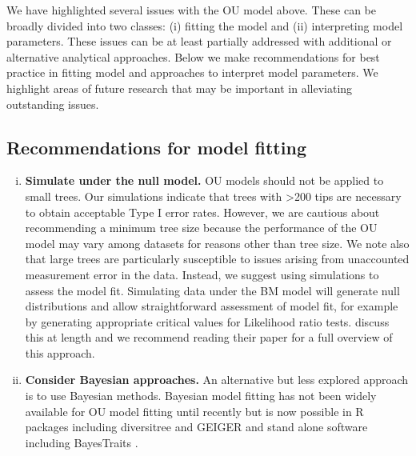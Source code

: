 \documentclass[a4paper,12pt]{article}
\begin{document}
  We have highlighted several issues with the OU model above. These can be broadly divided into two classes: (i) fitting the model and (ii) interpreting model parameters. These issues can be at least partially addressed with additional or alternative analytical approaches. Below we make recommendations for best practice in fitting model and approaches to interpret model parameters. We highlight areas of future research that may be important in alleviating outstanding issues.
  
  \subsection{Recommendations for model fitting}
    \begin{enumerate}[(i)]
      \item \textbf{Simulate under the null model.}
      OU models should not be applied to small trees. 
      Our simulations indicate that trees with \textgreater 200 tips are necessary to obtain acceptable Type I error rates. 
      However, we are cautious about recommending a minimum tree size because the performance of the OU model may vary among datasets for reasons other than tree size. 
      We note also that large trees are particularly susceptible to issues arising from unaccounted measurement error in the data. 
      Instead, we suggest using simulations to assess the model fit. 
      Simulating data under the BM model will generate null distributions \citep[e.g.,][]{boettiger2012your} and allow straightforward assessment of model fit, for example by generating appropriate critical values for Likelihood ratio tests. 
      \citet{boettiger2012your} discuss this at length and we recommend reading their paper for a full overview of this approach.
    
      \item \textbf{Consider Bayesian approaches.}
      An alternative but less explored approach is to use Bayesian methods. 
      Bayesian model fitting has not been widely available for OU model fitting until recently but is now possible in R packages including diversitree \citep{FitzJohn:2012aa} and GEIGER \citep[the Single Stationary Peak model in \texttt{fitContinuousMCMC};][]{Harmon:2008aa} and stand alone software including BayesTraits \citep{pagel2013bayestraits}.
	

\end{enumerate}
\end{document}
